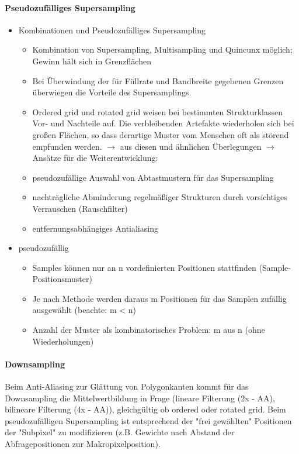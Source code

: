 \documentclass[10pt,landscape]{article}
\begin{document}
\begin{multicols}{3}
  \paragraph{Pseudozufälliges Supersampling}
  \begin{itemize}
    \item Kombinationen und Pseudozufälliges Supersampling
          \begin{itemize}
            \item Kombination von Supersampling, Multisampling und Quincunx möglich; Gewinn hält sich in Grenzflächen
            \item Bei Überwindung der für Füllrate und Bandbreite gegebenen Grenzen überwiegen die Vorteile des Supersamplings.
            \item Ordered grid und rotated grid weisen bei bestimmten Strukturklassen Vor- und Nachteile auf. Die verbleibenden Artefakte wiederholen sich bei großen Flächen, so dass derartige Muster vom Menschen oft als störend empfunden werden. $\rightarrow$ aus diesen und ähnlichen Überlegungen $\rightarrow$ Ansätze für die Weiterentwicklung:
            \item pseudozufällige Auswahl von Abtastmustern für das Supersampling
            \item nachträgliche Abminderung regelmäßiger Strukturen durch vorsichtiges Verrauschen (Rauschfilter)
            \item entfernungsabhängiges Antialiasing
          \end{itemize}
    \item pseudozufällig
          \begin{itemize}
            \item Samples können nur an n vordefinierten Positionen stattfinden (Sample-Positionsmuster)
            \item Je nach Methode werden daraus m Positionen für das Samplen zufällig ausgewählt (beachte: m < n)
            \item Anzahl der Muster als kombinatorisches Problem: m aus n (ohne Wiederholungen)
          \end{itemize}
  \end{itemize}
  
  \paragraph{Downsampling}
  Beim Anti-Aliasing zur Glättung von Polygonkanten kommt für das Downsampling die Mittelwertbildung in Frage (lineare Filterung (2x - AA), bilineare Filterung (4x - AA)), gleichgültig ob ordered oder rotated grid. Beim pseudozufälligen Supersampling ist entsprechend der "frei gewählten" Positionen der "Subpixel" zu modifizieren (z.B. Gewichte nach Abstand der Abfragepositionen zur Makropixelposition).
  

\end{multicols}
\end{document}
